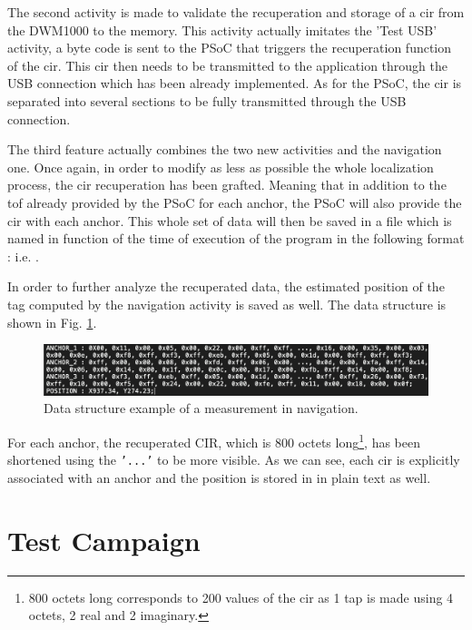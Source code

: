 The second activity is made to validate the recuperation and storage of a \gls{cir} from the DWM1000 to the memory. This activity actually imitates the 'Test USB' activity, a byte code is sent to the PSoC that triggers the recuperation function of the \gls{cir}. This \gls{cir} then needs to be transmitted to the application through the USB connection which has been already implemented. As for the PSoC, the \gls{cir} is separated into several sections to be fully transmitted through the USB connection.
\vspace{2mm}

The third feature actually combines the two new activities and the navigation one. Once again, in order to modify as less as possible the whole localization process, the \gls{cir} recuperation has been grafted. Meaning that in addition to the \gls{tof} already provided by the PSoC for each anchor, the PSoC will also provide the \gls{cir} with each anchor. This whole set of data will then be saved in a  file which is named in function of the time of execution of the program in the following format :  i.e. .
\vspace{2mm}

In order to further analyze the recuperated data, the estimated position of the tag computed by the navigation activity is saved as well. The data structure is shown in Fig. \ref{fig:saved_data}.

\begin{figure}[H]
\centering
\includegraphics[width=\linewidth]{Images/saved_cir.png}
\caption{Data structure example of a measurement in navigation. \label{fig:saved_data}}
\end{figure}

For each anchor, the recuperated CIR, which is 800 octets long\footnote{800 octets long corresponds to 200 values of the \gls{cir} as 1 tap is made using 4 octets, 2 real and 2 imaginary.}, has been shortened using the \texttt{'...'} to be more visible. As we can see, each \gls{cir} is explicitly associated with an anchor and the position is stored in  in plain text as well.

\section{Test Campaign}

